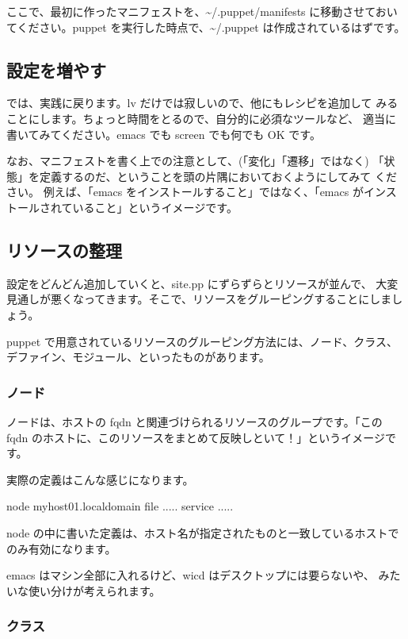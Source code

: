 \documentclass[mingoth,a4paper]{jsarticle}
\begin{document}
ここで、最初に作ったマニフェストを、\textasciitilde /.puppet/manifests に移動させておい
てください。puppet を実行した時点で、\textasciitilde /.puppet は作成されているはずです。


\subsection{設定を増やす}

では、実践に戻ります。lv だけでは寂しいので、他にもレシピを追加して
みることにします。ちょっと時間をとるので、自分的に必須なツールなど、
適当に書いてみてください。emacs でも screen でも何でも OK です。

なお、マニフェストを書く上での注意として、(「変化」「遷移」ではなく)
「状態」を定義するのだ、ということを頭の片隅においておくようにしてみて
ください。 例えば、「emacs をインストールすること」ではなく、「emacs
がインストールされていること」というイメージです。

\subsection{リソースの整理}

設定をどんどん追加していくと、site.pp にずらずらとリソースが並んで、
大変見通しが悪くなってきます。そこで、リソースをグルーピングすることにしましょう。

puppet で用意されているリソースのグルーピング方法には、ノード、クラス、
デファイン、モジュール、といったものがあります。

\subsubsection{ノード}

ノードは、ホストの fqdn と関連づけられるリソースのグループです。「この
fqdn のホストに、このリソースをまとめて反映しといて！」というイメージです。

実際の定義はこんな感じになります。

\begin{commandline}
node myhost01.localdomain {
  file {.....}
  service {.....}
}
\end{commandline}

node の中に書いた定義は、ホスト名が指定されたものと一致しているホストで
のみ有効になります。

emacs はマシン全部に入れるけど、wicd はデスクトップには要らないや、
みたいな使い分けが考えられます。

\subsubsection{クラス}
\end{document}
